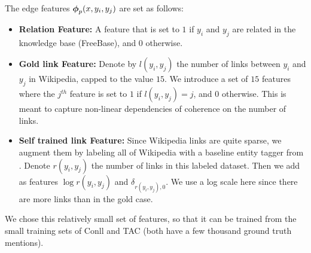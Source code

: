 The  edge features $\boldsymbol{\phi}_p(x,y_i,y_j)$ are set as follows:
\begin{itemize}
\item {\bf Relation Feature:} A feature that is set to $1$ if $y_i$ and $y_j$ are related in the knowledge base (FreeBase), and $0$ otherwise.
\item {\bf Gold link Feature:} Denote by $l(y_i,y_j)$ the number of links between $y_i$ and $y_j$ in Wikipedia, capped to the value $15$. We introduce a set of $15$ features where the $j^{th}$ feature is set to $1$ if $l(y_i,y_j) = j$, and $0$ otherwise. This is meant to capture non-linear dependencies of coherence
on the number of links.
\item {\bf Self trained link Feature:} Since Wikipedia links are quite sparse, we augment them by labeling all of Wikipedia with a baseline entity tagger from
\cite{Lazic2015}. Denote $r(y_i,y_j)$ the number of links in this labeled dataset. Then we add as features $\log{r(y_i,y_j)}$ and $\delta_{r(y_i,y_j),0}$. We use a log scale here since there are more links than in the gold case. 
\end{itemize}
We chose this relatively small set of features, so that it can be trained from the small training sets of Conll and TAC (both have a few thousand ground truth mentions).